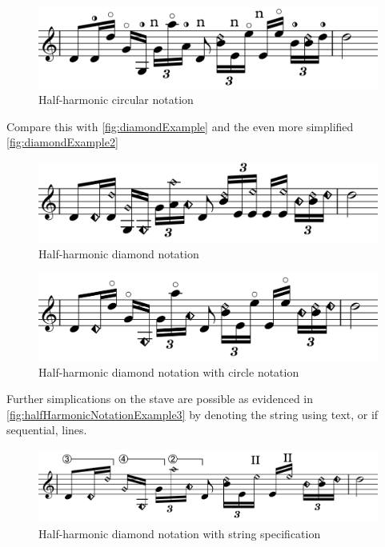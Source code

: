 \begin{figure}
    \includegraphics[width=\linewidth]{./resources/circleExample.pdf}
    \caption{Half-harmonic circular notation} \label{fig:circleExample}
  \end{figure}

Compare this with \autoref{fig:diamondExample} and the even more simplified \autoref{fig:diamondExample2}
  \begin{figure}
    \includegraphics[width=\linewidth]{./resources/diamondExample.pdf}
    \caption{Half-harmonic diamond notation} \label{fig:diamondExample}
  \end{figure}

  \begin{figure}
    \includegraphics[width=\linewidth]{./resources/diamondExample2.pdf}
    \caption{Half-harmonic diamond notation with circle notation} \label{fig:diamondExample2}
  \end{figure}

Further simplications on the stave are possible as evidenced in \autoref{fig:halfHarmonicNotationExample3} by denoting the string using text, or if sequential, lines.

\begin{figure}
    \includegraphics[width=\linewidth]{./resources/halfHarmonicNotationExample3.pdf}
    \caption{Half-harmonic diamond notation with string specification} \label{fig:halfHarmonicNotationExample3}
  \end{figure}

